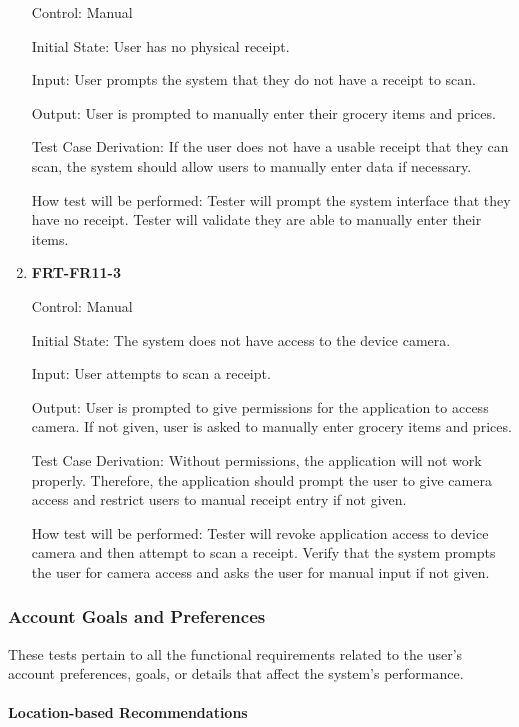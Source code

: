 \documentclass[12pt, titlepage]{article}
\begin{document}
\begin{enumerate}
Control: Manual
          
Initial State: User has no physical receipt.

Input: User prompts the system that they do not have a receipt to scan.
          
Output: User is prompted to manually enter their grocery items and prices.

Test Case Derivation: If the user does not have a usable receipt that they can scan, the system should allow users to manually
enter data if necessary.
          
How test will be performed: Tester will prompt the system interface that they have no receipt. Tester will validate they are able to manually enter their items.

\item{\textbf{FRT-FR11-3}}

Control: Manual
          
Initial State: The system does not have access to the device camera.

Input: User attempts to scan a receipt.
          
Output: User is prompted to give permissions for the application to access camera. If not given, user is asked to manually enter grocery items and prices.

Test Case Derivation: Without permissions, the application will not work properly. Therefore, the application should prompt the user to give
camera access and restrict users to manual receipt entry if not given.
          
How test will be performed: Tester will revoke application access to device camera and then attempt to scan a receipt. Verify that the system prompts the user for camera access and asks the user for manual input if not given.

\end{enumerate}

\subsubsection{Account Goals and Preferences}

These tests pertain to all the functional requirements related to the user's account preferences, goals, or details that affect the system's performance.

\paragraph{Location-based Recommendations}
\end{document}
